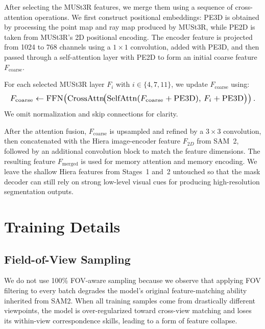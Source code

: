 After selecting the MUSt3R features, we merge them using a sequence of cross-attention operations.  
We first construct positional embeddings: PE3D is obtained by processing the point map and ray map produced by MUSt3R, while PE2D is taken from MUSt3R’s 2D positional encoding.  
The encoder feature is projected from 1024 to 768 channels using a $1\!\times\!1$ convolution, added with PE3D, and then passed through a self-attention layer with PE2D to form an initial coarse feature $F_{\text{coarse}}$.

For each selected MUSt3R layer $F_i$ with $i \in \{4,7,11\}$, we update $F_{\text{coarse}}$ using:
\begin{equation} \small
\resizebox{\columnwidth}{!}{$
F_{\text{coarse}}
\leftarrow
\mathrm{FFN}\!\left(
\mathrm{CrossAttn}\!\big(
\mathrm{SelfAttn}(F_{\text{coarse}} + \mathrm{PE3D}),
\, F_i + \mathrm{PE3D}
\big)\right).
$}
\end{equation}
We omit normalization and skip connections for clarity.

After the attention fusion, $F_{\text{coarse}}$ is upsampled and refined by a $3\!\times\!3$ convolution, then concatenated with the Hiera image-encoder feature $F_{2D}$ from SAM~2, followed by an additional convolution block to match the feature dimensions.  
The resulting feature $F_{\text{merged}}$ is used for memory attention and memory encoding.  
We leave the shallow Hiera features from Stages~1 and~2 untouched so that the mask decoder can still rely on strong low-level visual cues for producing high-resolution segmentation outputs.


\section{Training Details} \label{sec:training_details}
\subsection{Field-of-View Sampling}
We do not use 100\% FOV-aware sampling because we observe that applying FOV filtering to every batch degrades the model’s original feature-matching ability inherited from SAM2.  
When all training samples come from drastically different viewpoints, the model is over-regularized toward cross-view matching and loses its within-view correspondence skills, leading to a form of feature collapse.  



